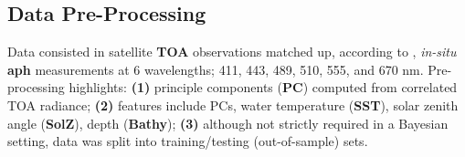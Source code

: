 \documentclass[a0,portrait]{a0poster}
\begin{document}
\begin{multicols}{2}
\subsection*{Data Pre-Processing}
Data consisted in satellite \textbf{TOA} observations matched up, according to \cite{Bailey:06}, \textit{in-situ} \textbf{aph} measurements at 6 wavelengths; 411, 443, 489, 510, 555, and 670 nm. Pre-processing highlights: \textbf{(1)} principle components (\textbf{PC}) computed from correlated TOA radiance; \textbf{(2)} features include PCs, water temperature (\textbf{SST}), solar zenith angle (\textbf{SolZ}), depth (\textbf{Bathy}); \textbf{(3)} although not strictly required in a Bayesian setting, data was split into training/testing (out-of-sample) sets.
\begin{center}
\end{center}


\end{multicols}
\end{document}
